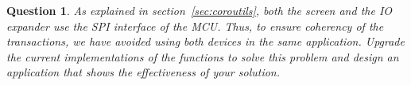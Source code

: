 \documentclass[11pt]{report}
\newtheorem{ex}{Question}
\newcommand{\unixcl}[1]{\texttt{\fcolorbox{black}{gray!20}{\footnotesize#1}}}
\begin{document}
\begin{ex}
    As explained in section~\ref{sec:coroutils}, both the screen and the IO expander use the SPI interface of the MCU. Thus, to ensure coherency of the transactions, we have avoided using both devices in the same application. Upgrade the current implementations of the functions to solve this problem and design an application that shows the effectiveness of your solution.
\end{ex}










\end{document}
